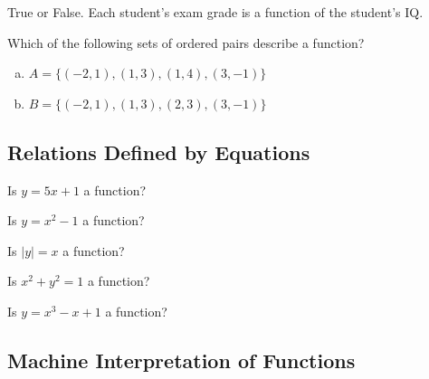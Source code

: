 \documentclass[oneside,10pt]{book}
\begin{document}
\example
True or False. Each student's exam grade is a function of the student's IQ.
\vspace{1in}



\example
   Which of the following sets of ordered pairs describe a function?
  \begin{enumerate}[(a)]
    \item  $A = \{ (-2,1), (1,3), (1,4), (3,-1) \}$
    \item  $B = \{ (-2,1), (1,3), (2,3), (3,-1) \}$
  \end{enumerate}










\subsection{Relations Defined by Equations}

\example
Is $y=5x+1$ a function?
\vfill


\example
Is $y=x^2-1$ a function?
\vfill


\example
Is $|y|=x$ a function?
\vfill


\example
Is $x^2+y^2=1$ a function?
\vfill



\example
Is $y=x^3-x+1$ a function?
\vfill


\newpage


\subsection{Machine Interpretation of Functions}
\end{document}
